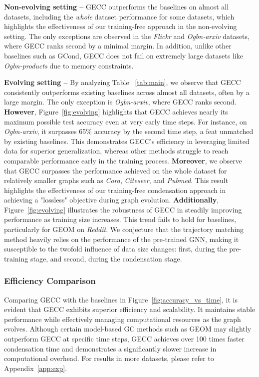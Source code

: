 \textbf{Non-evolving setting --} GECC outperforms the baselines on almost all datasets, including the \emph{whole} dataset performance for some datasets, which highlights the effectiveness of our training-free approach in the non-evolving setting. The only exceptions are observed in the \textit{Flickr} and \textit{Ogbn-arxiv} datasets, where GECC ranks second by a minimal margin. In addition, unlike other baselines such as GCond, GECC does not fail on extremely large datasets like \textit{Ogbn-products} due to memory constraints. 

\textbf{Evolving setting --} By analyzing Table ~\ref{tab:main}, we observe that GECC consistently outperforms existing baselines across almost all datasets, often by a large margin. The only exception is \textit{Ogbn-arxiv}, where GECC ranks second. \textbf{However}, Figure~\ref{fig:evolving} highlights that GECC achieves nearly its maximum possible test accuracy even at very early time steps. For instance, on \textit{Ogbn-arxiv}, it surpasses 65\% accuracy by the second time step, a feat unmatched by existing baselines. This demonstrates GECC’s efficiency in leveraging limited data for superior generalization, whereas other methods struggle to reach comparable performance early in the training process. 
\textbf{Moreover}, we observe that GECC surpasses the performance achieved on the whole dataset for relatively smaller graphs such as \textit{Cora}, \textit{Citeseer}, and \textit{Pubmed}. This result highlights the effectiveness of our training-free condensation approach in achieving a "lossless" objective during graph evolution. \textbf{Additionally}, Figure~\ref{fig:evolving} illustrates the robustness of GECC in steadily improving performance as training size increases. This trend fails to hold for baselines, particularly for GEOM on \textit{Reddit}. We conjecture that the trajectory matching method heavily relies on the performance of the pre-trained GNN, making it susceptible to the twofold influence of data size changes: first, during the pre-training stage, and second, during the condensation stage.


\subsubsection{Efficiency Comparison}
Comparing GECC with the baselines in Figure~\ref{fig:accuracy_vs_time}, it is evident that GECC exhibits superior efficiency and scalability. It maintains stable performance while effectively managing computational resources as the graph evolves. Although certain model-based GC methods such as GEOM may slightly outperform GECC at specific time steps, GECC achieves over 100 times faster condensation time and demonstrates a significantly slower increase in computational overhead. For results in more datasets, please refer to Appendix~\ref{app:exp}.

